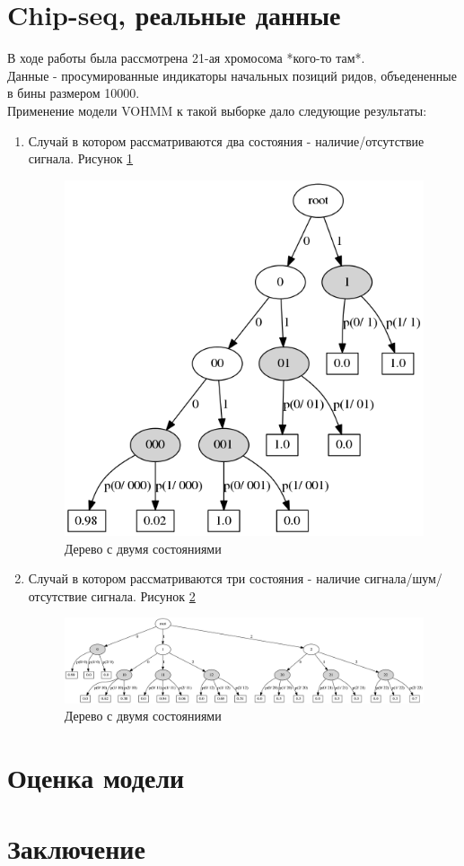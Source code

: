 \documentclass[10pt,a4paper]{article}
\begin{document}
\section{Chip-seq, реальные данные}
В ходе работы была рассмотрена 21-ая хромосома *кого-то там*.
\\Данные - просумированные индикаторы начальных позиций ридов, объедененные в бины размером 10000.
\\Применение модели VOHMM к такой выборке дало следующие результаты:
\begin{enumerate}
\item
Случай в котором рассматриваются два состояния - наличие/отсутствие сигнала.
Рисунок \ref{ris:real_2_states}
\begin{figure}[hиtз]
	\includegraphics[scale=0.3]{img/real_2_states.png}
	\centering
	\caption{ Дерево с двумя состояниями }
	\label{ris:real_2_states}
\end{figure}
\item
Случай в котором рассматриваются три состояния - наличие сигнала/шум/отсутствие сигнала.
Рисунок \ref{ris:real_3_states}
\begin{figure}[hиtз]
	\includegraphics[scale=0.3]{img/real_3_states.png}
	\centering
	\caption{ Дерево с двумя состояниями }
	\label{ris:real_3_states}
\end{figure}
\end{enumerate}


\section{Оценка модели}

\section{Заключение}



\end{document}
